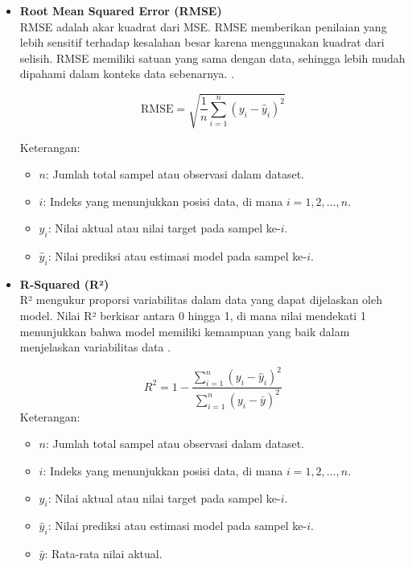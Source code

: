 \documentclass[12pt,a4paper]{article}
\begin{document}
\begin{itemize}
    \item \textbf{Root Mean Squared Error (RMSE)} \\
    RMSE adalah akar kuadrat dari MSE. RMSE memberikan penilaian yang lebih sensitif terhadap kesalahan besar karena menggunakan kuadrat dari selisih. RMSE memiliki satuan yang sama dengan data, sehingga lebih mudah dipahami dalam konteks data sebenarnya. \cite{rmse}.
    
    \[
    \text{RMSE} = \sqrt{\frac{1}{n} \sum_{i=1}^{n} (y_i - \hat{y}_i)^2}
    \]

    Keterangan:
    \begin{itemize}
        \item $n$: Jumlah total sampel atau observasi dalam dataset.
        \item $i$: Indeks yang menunjukkan posisi data, di mana $i = 1, 2, \dots, n$.
        \item $y_i$: Nilai aktual atau nilai target pada sampel ke-$i$.
        \item $\hat{y}_i$: Nilai prediksi atau estimasi model pada sampel ke-$i$.
    \end{itemize}
    
    \item \textbf{R-Squared (R²)} \\
    R² mengukur proporsi variabilitas dalam data yang dapat dijelaskan oleh model. Nilai R² berkisar antara 0 hingga 1, di mana nilai mendekati 1 menunjukkan bahwa model memiliki kemampuan yang baik dalam menjelaskan variabilitas data \cite{r2}.
    
    \[
    R^2 = 1 - \frac{\sum_{i=1}^{n} (y_i - \hat{y}_i)^2}{\sum_{i=1}^{n} (y_i - \bar{y})^2}
    \]
    Keterangan:
    \begin{itemize}
        \item $n$: Jumlah total sampel atau observasi dalam dataset.
        \item $i$: Indeks yang menunjukkan posisi data, di mana $i = 1, 2, \dots, n$.
        \item $y_i$: Nilai aktual atau nilai target pada sampel ke-$i$.
        \item $\hat{y}_i$: Nilai prediksi atau estimasi model pada sampel ke-$i$.
        \item $\bar{y}$: Rata-rata nilai aktual.
    \end{itemize}
\end{itemize}
\end{document}
